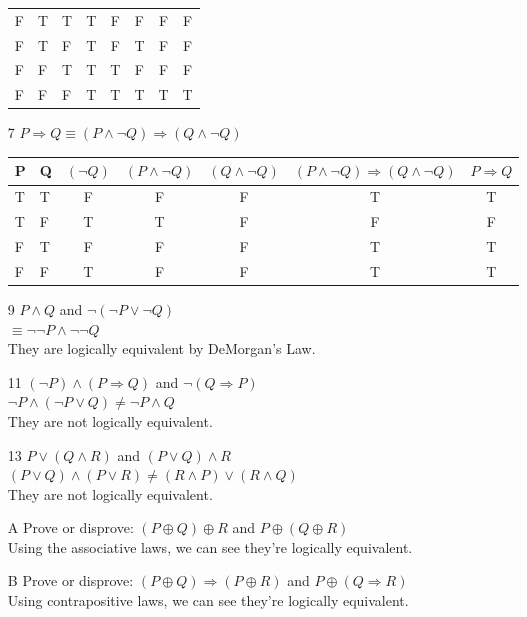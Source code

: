 \documentclass[12pt]{article}
\begin{document}
\begin{enumerate}
\begin{tabular}{l|l|l|c|c|c|c|c}
		F & T & T & T   & F    & F    & F & F \\
		F & T & F & T   & F    & T    & F & F \\
		F & F & T & T   & T    & F    & F & F \\
		F & F & F & T   & T    & T    & T & T \\
		\hline
	    \end{tabular}
    \item [7] $P\Rightarrow Q \equiv (P \land \neg Q) \Rightarrow (Q \land \neg Q)$\\
	    \begin{tabular}{l|l|c|c|c|c|c}
		\hline
		P & Q & $(\neg Q)$ & $(P \land \neg Q)$ & $(Q \land \neg Q)$ & $ (P \land \neg Q) \Rightarrow (Q \land \neg Q)$ & $P\Rightarrow Q$\\
		\hline
		T & T & F     & F         & F & T & T \\
		T & F & T     & T         & F & F & F \\
		F & T & F     & F         & F & T & T \\
		F & F & T     & F         & F & T & T \\
		\hline
	    \end{tabular}
	\item [9] $P \land Q$ and $\neg(\neg P \lor \neg Q)$\\
	    $\equiv \neg\neg P \land \neg \neg Q$\\
	    They are logically equivalent by DeMorgan's Law.
	\item [11] $(\neg P) \land (P \Rightarrow Q)$ and $\neg (Q \Rightarrow P)$\\
	    $\neg P \land (\neg P \lor Q) \neq \neg P \land Q$\\
	    They are not logically equivalent.
	\item [13] $P \lor (Q \land R)$ and $(P \lor Q) \land R$\\
	    $(P\lor Q) \land (P\lor R) \neq (R\land P) \lor (R \land Q)$\\
	    They are not logically equivalent.
	\item [A] Prove or disprove: $(P \oplus Q) \oplus R$ and $P \oplus (Q \oplus R)$\\
	    Using the associative laws, we can see they're logically equivalent.
	\item [B] Prove or disprove: $(P \oplus Q) \Rightarrow (P \oplus R)$ and $P \oplus (Q \Rightarrow R)$\\
	    Using contrapositive laws, we can see they're logically equivalent.
\end{enumerate}
\end{document}
